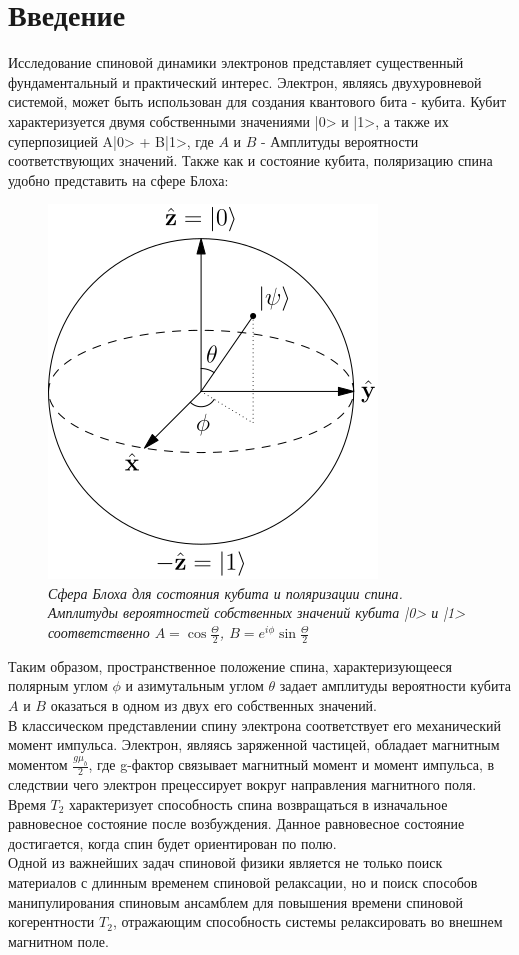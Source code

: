 \documentclass[a4paper,12pt]{article}
\begin{document}
\tableofcontents
\newpage

\section{Введение}
Исследование спиновой динамики электронов представляет существенный фундаментальный и практический интерес. Электрон, являясь двухуровневой системой, может быть использован для создания квантового бита - кубита. Кубит характеризуется двумя собственными значениями |0> и |1>, а также их суперпозицией A|0> + B|1>, где $A$ и $B$ - Амплитуды вероятности соответствующих значений. Также как и состояние кубита, поляризацию спина удобно представить на сфере Блоха:

\begin{figure}
	\includegraphics[scale = 0.4]{Bloch.png}
	\caption{\textit{Сфера Блоха для состояния кубита и поляризации спина. Амплитуды вероятностей собственных значений кубита |0> и |1> соответственно $A = \cos{\frac{\Theta}{2}}$, $B = e^{i \phi} \sin{\frac{\Theta}{2}}$}}
		\label{fig:Bloch}
\end{figure}

Таким образом, пространственное положение спина, характеризующееся полярным углом $\phi$ и азимутальным углом $\theta$ задает амплитуды вероятности кубита $A$ и $B$ оказаться в одном из двух его собственных значений. \\

В классическом представлении спину электрона соответствует его механический момент импульса. Электрон, являясь заряженной частицей, обладает магнитным моментом $\frac{g \mu_b}{2}$, где g-фактор связывает магнитный момент и момент импульса, в следствии чего электрон прецессирует вокруг направления магнитного поля. Время $T_2$ характеризует способность спина возвращаться в изначальное равновесное состояние после возбуждения. Данное равновесное состояние достигается, когда спин будет ориентирован по полю.\\
Одной из важнейших задач спиновой физики является не только поиск материалов с длинным временем спиновой релаксации, но и поиск способов манипулирования спиновым ансамблем для повышения времени спиновой когерентности $T_2$, отражающим способность системы релаксировать во внешнем магнитном поле. \\
\end{document}
